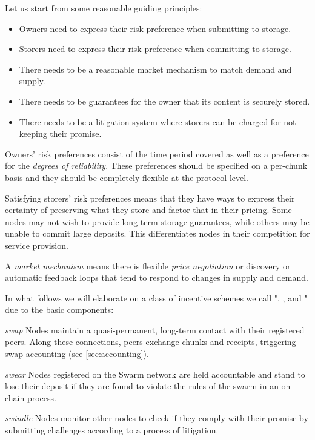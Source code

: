 
Let us start from some reasonable guiding principles:

\begin{itemize}
\item Owners need to express their risk preference when submitting to storage.
\item Storers need to express their risk preference when committing to storage.
\item There needs to be a reasonable market mechanism to match demand and supply.
\item There needs to be guarantees for the owner that its content is securely stored.
\item There needs to be a litigation system where storers can be charged for not keeping their promise.
\end{itemize}

Owners' risk preferences consist of the time period covered as well as a preference for the \emph{degrees of reliability}. These preferences should be specified on a per-chunk basis and they should be completely flexible at the protocol level.

Satisfying storers' risk preferences means that they have ways to express their certainty of preserving what they store and factor that in their pricing. Some nodes may not wish to provide long-term storage guarantees, while others may be unable to commit large deposits. This differentiates nodes in their competition for service provision.

A \emph{market mechanism} means there is flexible \emph{price negotiation} or discovery or automatic feedback loops that tend to respond to changes in supply and demand.

In what follows we will elaborate on a class of incentive schemes we call ", , and " due to the basic components:

\begin{labelledlist}
\item [\emph{swap}]
  Nodes maintain a quasi-permanent, long-term contact with their registered peers. Along these connections, peers exchange chunks and receipts, triggering swap accounting (see \ref{sec:accounting}).
  
\item [\emph{swear}]
  Nodes registered on the Swarm network are held accountable and stand to lose their deposit if they are found to violate the rules of the swarm in an on-chain  process.

\item [\emph{swindle}]
  Nodes monitor other nodes to check if they comply with their promise by submitting challenges according to a process of litigation.

\end{labelledlist}

